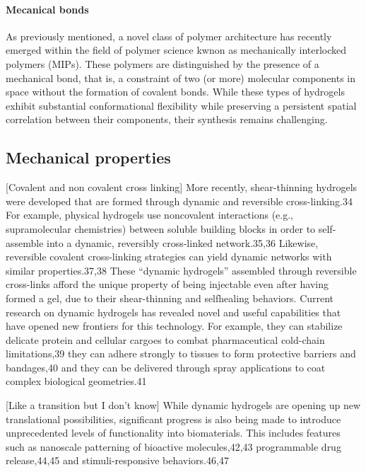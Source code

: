 \paragraph{Mecanical bonds}
As previously mentioned, a novel class of polymer architecture has recently emerged within the field of polymer science kwnon as mechanically interlocked polymers (MIPs). 
These polymers are distinguished by the presence of a mechanical bond, that is, a constraint of two (or more) molecular components in space without the formation of covalent bonds\citep{hartMaterialPropertiesApplications2021}.
While these types of hydrogels exhibit substantial conformational flexibility while preserving a persistent spatial correlation between their components, their synthesis remains challenging.

\subsection{Mechanical properties}

[Covalent and non covalent cross linking]
More recently, shear-thinning hydrogels were developed that  are formed through dynamic and reversible cross-linking.34 
For example, physical hydrogels use noncovalent interactions (e.g., supramolecular chemistries) between soluble building blocks in order to self-assemble into a dynamic, reversibly cross-linked  network.35,36 
Likewise, reversible covalent cross-linking strategies can yield dynamic networks with similar properties.37,38 These “dynamic hydrogels” assembled through reversible cross-links afford the unique property of being injectable even after having formed a gel, due to their shear-thinning and selfhealing behaviors. 
Current research on dynamic hydrogels has revealed novel and useful capabilities that have opened new frontiers for this technology. 
For example, they can stabilize delicate protein and cellular cargoes to combat pharmaceutical  cold-chain limitations,39 they can adhere strongly to tissues to  form protective barriers and bandages,40 and they can be delivered through spray applications to coat complex biological  geometries.41\citep{correaTranslationalApplicationsHydrogels2021}

[Like a transition but I don't know]
While dynamic hydrogels are opening up new translational possibilities, significant progress is also being made to introduce unprecedented levels of functionality into biomaterials. 
This includes features such as nanoscale patterning of  bioactive molecules,42,43 programmable drug release,44,45 and  stimuli-responsive behaviors.46,47\citep{correaTranslationalApplicationsHydrogels2021} 


